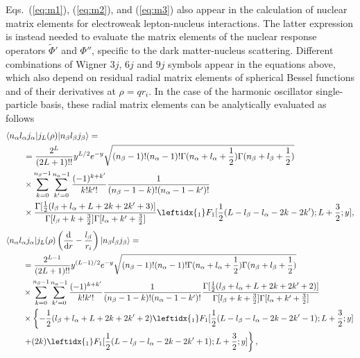 \documentclass[11pt,a4paper]{article}
\begin{document}
Eqs.~(\ref{eq:m1}), (\ref{eq:m2}), and (\ref{eq:m3}) also appear in the calculation of nuclear matrix elements for electroweak lepton-nucleus interactions.
The latter expression is instead needed to evaluate the matrix elements of the nuclear response operators $\tilde{\Phi}'$ and $\Phi''$, specific to the dark matter-nucleus scattering. 
Different combinations of Wigner $3j$, $6j$ and $9j$ symbols appear in the equations above, which also depend on residual radial matrix elements of spherical Bessel functions and of their derivatives at $\rho=qr_i$. 
In the case of the harmonic oscillator single-particle basis, these radial matrix elements can be analytically evaluated as follows 
\begin{align*}
  &\langle n_\alpha l_\alpha j_\alpha | j_{L}(\rho)| n_\beta l_\beta j_\beta \rangle =\\ &\qquad=\frac{2^{L}}{(2L+1)!!}y^{L/2}e^{-y}\sqrt{(n_\beta-1)!(n_\alpha-1)!\Gamma(n_\alpha+l_\alpha+\frac{1}{2})\Gamma(n_\beta+l_\beta+\frac{1}{2})}\\
&\qquad\times\sum_{k=0}^{n_\beta-1}\sum_{k'=0}^{n_\alpha-1}\frac{(-1)^{k+k'}}{k!k'!}\frac{1}{(n_\beta-1-k)!(n_\alpha-1-k')!}\nonumber\\
&\qquad\times\frac{\Gamma[\frac{1}{2}(l_\beta+l_\alpha+L+2k+2k'+3)]}{\Gamma[l_\beta+k+\frac{3}{2}]\Gamma[l_\alpha+k'+\frac{3}{2}]}
\leftidx{_{1}}F_{1}[\frac{1}{2}(L-l_\beta-l_\alpha-2k-2k');L+\frac{3}{2};y],
\end{align*}
\begin{align*}
&\langle n_\alpha l_\alpha j_\alpha |j_{L}(\rho)\left(\frac{\text{d}}{\text{d}r}-\frac{l_\beta}{r_i}\right)|n_\beta l_\beta j_\beta \rangle =\\ &\qquad=\frac{2^{L-1}}{(2L+1)!!}y^{(L-1)/2}e^{-y}\sqrt{(n_\beta-1)!(n_\alpha-1)!\Gamma(n_\alpha+l_\alpha+\frac{1}{2})\Gamma(n_\beta+l_\beta+\frac{1}{2})}\\
&\qquad\times\sum_{k=0}^{n_\beta-1}\sum_{k'=0}^{n_\alpha-1}\frac{(-1)^{k+k'}}{k!k'!}\frac{1}{(n_\beta-1-k)!(n_\alpha-1-k')!} \frac{\Gamma[\frac{1}{2}(l_\beta+l_\alpha+L+2k+2k'+2)]}{\Gamma[l_\beta+k+\frac{3}{2}]\Gamma[l_\alpha+k'+\frac{3}{2}]}\\
&\qquad\times\left\{-\frac{1}{2}(l_\beta+l_\alpha+L+2k+2k'+2)\leftidx{_{1}}F_{1}[\frac{1}{2}(L-l_\beta-l_\alpha-2k-2k'-1);L+\frac{3}{2};y]\right.\\
&\left.\qquad +(2k)\leftidx{_{1}}F_{1}[\frac{1}{2}(L-l_\beta-l_\alpha-2k-2k'+1);L+\frac{3}{2};y]\right\},
\end{align*}
\end{document}
